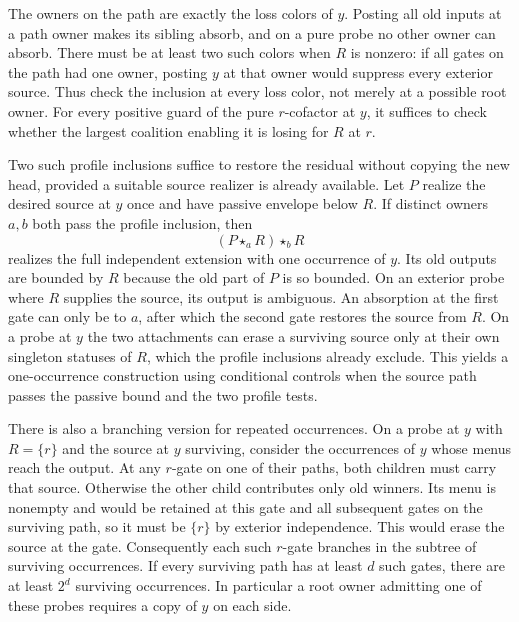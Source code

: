 The owners on the path are exactly the loss colors of $y$.
Posting all old inputs at a path owner makes its sibling
absorb, and on a pure probe no other owner can absorb. There
must be at least two such colors when $R$ is nonzero: if all
gates on the path had one owner, posting $y$ at that owner
would suppress every exterior source. Thus check the inclusion
at every loss color, not merely at a possible root owner. For
every positive guard of the pure $r$-cofactor at $y$, it suffices
to check whether the largest coalition enabling it is losing
for $R$ at $r$.

Two such profile inclusions suffice to restore the residual
without copying the new head, provided a suitable source realizer
is already available. Let $P$ realize the desired source at $y$
once and have passive envelope below $R$. If distinct owners
$a,b$ both pass the profile inclusion, then
\[
  (P\star_a R)\star_b R
\]
realizes the full independent extension with one occurrence
of $y$. Its old outputs are bounded by $R$ because the old part
of $P$ is so bounded. On an exterior probe where $R$ supplies
the source, its output is ambiguous. An absorption at the first
gate can only be to $a$, after which the second gate restores
the source from $R$. On a probe at $y$ the two attachments can
erase a surviving source only at their own singleton statuses
of $R$, which the profile inclusions already exclude. This yields
a one-occurrence construction using conditional controls when
the source path passes the passive bound and the two profile tests.

There is also a branching version for repeated occurrences.
On a probe at $y$ with $R=\{r\}$ and the source at $y$ surviving,
consider the occurrences of $y$ whose menus reach the output.
At any $r$-gate on one of their paths, both children must carry
that source. Otherwise the other child contributes only old
winners. Its menu is nonempty and would be retained at this
gate and all subsequent gates on the surviving path, so it must
be $\{r\}$ by exterior independence. This would erase the
source at the gate. Consequently each such $r$-gate branches
in the subtree of surviving occurrences. If every surviving
path has at least $d$ such gates, there are at least $2^d$
surviving occurrences. In particular a root owner admitting
one of these probes requires a copy of $y$ on each side.

